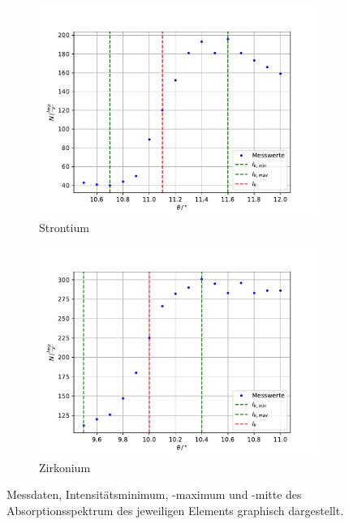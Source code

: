 \begin{figure}[t!]
\medskip
\begin{subfigure}{0.48\textwidth}
\includegraphics[width=\linewidth]{content/data/strontium.pdf}
\caption{Strontium} \label{fig:strontium}
\end{subfigure}\hspace*{\fill}
\begin{subfigure}{0.48\textwidth}
\includegraphics[width=\linewidth]{content/data/zirkonium.pdf}
\caption{Zirkonium} \label{fig:zirkonium}
\end{subfigure}
\caption{Messdaten, Intensitätsminimum, -maximum und -mitte des Absorptionsspektrum des jeweiligen Elements graphisch dargestellt. \cite{numpy} \cite{matplotlib}}
\label{fig:elemente}
\end{figure}

